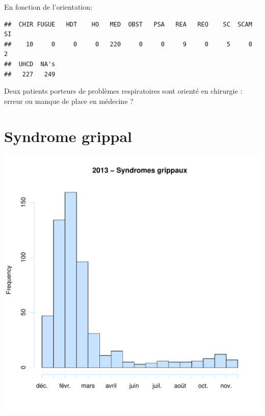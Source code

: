 \documentclass[12pt,english,french,twoside]{report}\usepackage[]{graphicx}\usepackage[]{color}
\makeatletter
\def\maxwidth{ %
  \ifdim\Gin@nat@width>\linewidth
    \linewidth
  \else
    \Gin@nat@width
  \fi
}
\newenvironment{kframe}{%
 \def\at@end@of@kframe{}%
 \ifinner\ifhmode%
  \def\at@end@of@kframe{\end{minipage}}%
  \begin{minipage}{\columnwidth}%
 \fi\fi%
 \def\FrameCommand##1{\hskip\@totalleftmargin \hskip-\fboxsep
 \colorbox{shadecolor}{##1}\hskip-\fboxsep
     \hskip-\linewidth \hskip-\@totalleftmargin \hskip\columnwidth}%
 \MakeFramed {\advance\hsize-\width
   \@totalleftmargin\z@ \linewidth\hsize
   \@setminipage}}%
 {\par\unskip\endMakeFramed%
 \at@end@of@kframe}
\newenvironment{knitrout}{}{} %
\makeatother
\begin{document}
En fonction de l'orientation:
\begin{knitrout}
\color{fgcolor}\begin{kframe}
\begin{verbatim}
##  CHIR FUGUE   HDT    HO   MED  OBST   PSA   REA   REO    SC  SCAM    SI 
##    10     0     0     0   220     0     0     9     0     5     0     2 
##  UHCD  NA's 
##   227   249
\end{verbatim}
\end{kframe}
\end{knitrout}


Deux patients porteurs de problèmes respiratoires sont orienté en chirurgie : erreur ou manque de place en médecine ?

\section{Syndrome grippal}

\begin{knitrout}
\color{fgcolor}
\includegraphics[width=\maxwidth]{figure/grippe} 

\end{knitrout}
\end{document}
